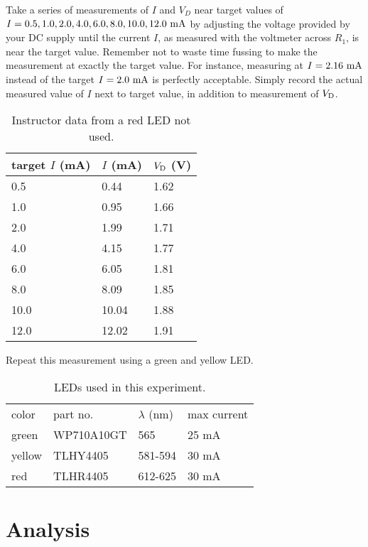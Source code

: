 Take a series of measurements of $I$ and $V_D$ near target values of
$I = 0.5,1.0,2.0,4.0,6.0,8.0,10.0,12.0~\rm mA$ by adjusting the
voltage provided by your DC supply until the current $I$, as measured
with the voltmeter across $R_1$, is near the target value.  Remember
not to waste time fussing to make the measurement at exactly the
target value.  For instance, measuring at $I=2.16~\rm mA$ instead of
the target $I=2.0 ~\rm mA$ is perfectly acceptable.  Simply record the
actual measured value of $I$ next to target value, in addition to
measurement of $V_{\rm D}$.  

\begin{table}
\begin{center}
\caption{Instructor data from a red LED not used.}
\begin{tabular}{lll}
target $I$ (mA) & $I$ (mA) & $V_{\rm D}$ (V) \\
\hline
0.5  &  0.44  & 1.62 \\
1.0  &  0.95  & 1.66 \\
2.0  &  1.99  & 1.71 \\
4.0  &  4.15  & 1.77 \\
6.0  &  6.05  & 1.81 \\
8.0  &  8.09  & 1.85 \\
10.0 &  10.04 & 1.88 \\
12.0 &  12.02 & 1.91 \\ 
\end{tabular}
\end{center}
\end{table}

Repeat this measurement using a green and yellow LED.

\begin{table}[htbp]
\begin{center}
\caption{LEDs used in this experiment.}
\begin{tabular}{llll}
color & part no. & $\lambda$ (nm) & max current \\
green & WP710A10GT & 565 & 25 mA \\  
yellow & TLHY4405 & 581-594 & 30 mA \\ 
red & TLHR4405 & 612-625 & 30 mA \\ 
\end{tabular}
\end{center}
\end{table}

\section{Analysis}

